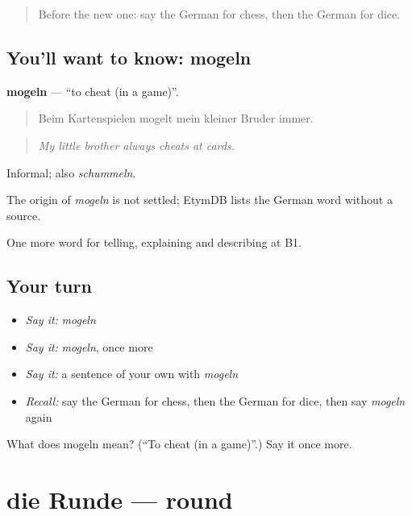 \begin{quote}
Before the new one: say the German for chess, then the German for dice.
\end{quote}

\subsection*{You'll want to know: mogeln}
\textbf{mogeln} — \textquotedblleft{}to cheat (in a game)\textquotedblright{}.

\begin{quote}
Beim Kartenspielen mogelt mein kleiner Bruder immer.
\end{quote}

\begin{quote}
\emph{My little brother always cheats at cards.}
\end{quote}

Informal; also \emph{schummeln}.

\begin{cousinweb}
The origin of \emph{mogeln} is not settled; EtymDB lists the German word without a source.
\end{cousinweb}

\begin{grammarlens}[title={What you've built}]
One more word for telling, explaining and describing at B1.
\end{grammarlens}

\subsection*{Your turn}
\begin{itemize}
\raggedright
  \item \emph{Say it:} \emph{mogeln}
  \item \emph{Say it:} \emph{mogeln}, once more
  \item \emph{Say it:} a sentence of your own with \emph{mogeln}
  \item \emph{Recall:} say the German for chess, then the German for dice, then say \emph{mogeln} again
\end{itemize}

\begin{tcolorbox}[breakable,colback=teal!4,colframe=teal!35!black,title={Before you move on}]
What does mogeln mean? (\textquotedblleft{}To cheat (in a game)\textquotedblright{}.) Say it once more.
\end{tcolorbox}
\section[die Runde]{die Runde — round}

